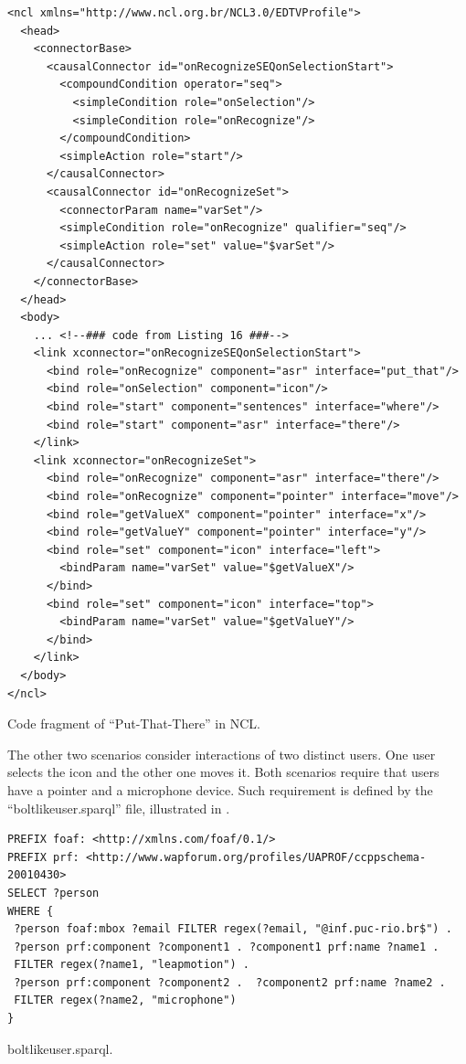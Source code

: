 \documentclass[
  doutorado,
  american
]{ThesisPUC}
\newcommand{\captionvspace}{\vspace{-1.3em}}
\begin{document}
\begin{verbatim}
<ncl xmlns="http://www.ncl.org.br/NCL3.0/EDTVProfile">
  <head>
    <connectorBase>
      <causalConnector id="onRecognizeSEQonSelectionStart">
        <compoundCondition operator="seq">
          <simpleCondition role="onSelection"/>
          <simpleCondition role="onRecognize"/>
        </compoundCondition>
        <simpleAction role="start"/>
      </causalConnector>
      <causalConnector id="onRecognizeSet">
        <connectorParam name="varSet"/>
        <simpleCondition role="onRecognize" qualifier="seq"/>
        <simpleAction role="set" value="$varSet"/>
      </causalConnector>
    </connectorBase>
  </head>
  <body>
    ... <!--### code from Listing 16 ###-->
    <link xconnector="onRecognizeSEQonSelectionStart">
      <bind role="onRecognize" component="asr" interface="put_that"/>
      <bind role="onSelection" component="icon"/>
      <bind role="start" component="sentences" interface="where"/>
      <bind role="start" component="asr" interface="there"/>
    </link>
    <link xconnector="onRecognizeSet">
      <bind role="onRecognize" component="asr" interface="there"/>
      <bind role="onRecognize" component="pointer" interface="move"/>
      <bind role="getValueX" component="pointer" interface="x"/>
      <bind role="getValueY" component="pointer" interface="y"/>
      <bind role="set" component="icon" interface="left">
        <bindParam name="varSet" value="$getValueX"/>
      </bind>
      <bind role="set" component="icon" interface="top">
        <bindParam name="varSet" value="$getValueY"/>
      </bind>
    </link>
  </body>
</ncl>
\end{verbatim}
\captionvspace
\begin{listing}[!ht]
\caption{Code fragment of “Put-That-There” in NCL.}

\label{list:annexb4}
\end{listing}

The other two scenarios consider interactions of two distinct users. One user
selects the icon and the other one moves it. Both scenarios require that users
have a pointer and a microphone device. Such requirement is defined by the
“boltlikeuser.sparql” file, illustrated in \label{list:annexb5}.

\begin{listing}[!ht]
\begin{verbatim}
PREFIX foaf: <http://xmlns.com/foaf/0.1/>
PREFIX prf: <http://www.wapforum.org/profiles/UAPROF/ccppschema-20010430>
SELECT ?person
WHERE {
 ?person foaf:mbox ?email FILTER regex(?email, "@inf.puc-rio.br$") .
 ?person prf:component ?component1 . ?component1 prf:name ?name1 .
 FILTER regex(?name1, "leapmotion") .
 ?person prf:component ?component2 .  ?component2 prf:name ?name2 .
 FILTER regex(?name2, "microphone")
}
\end{verbatim}
\caption{boltlikeuser.sparql.}
\label{list:annex5}
\end{listing}
\end{document}
